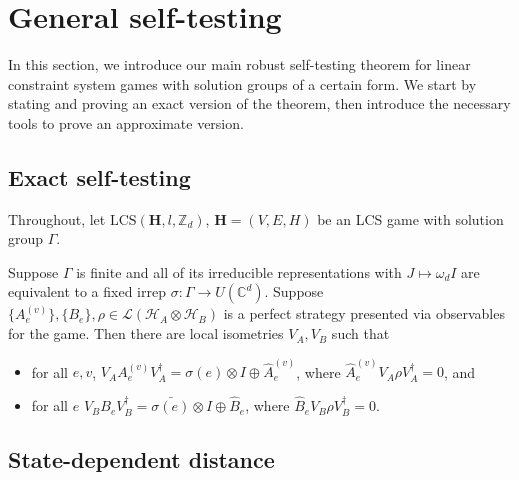 
\chapter{General self-testing}\label{sec:self-testing}

In this section, we introduce our main robust self-testing theorem for linear constraint system games with solution groups of a certain form. We start by stating and proving an exact version of the theorem, then introduce the necessary tools to prove an approximate version.

\section{Exact self-testing}
\label{subsection:exact-self-testing}

Throughout, let $\text{LCS}(\mathbf{H}, l, \mathbb{Z}_d)$, $\mathbf{H} = (V,E,H)$ be an LCS game with solution group $\Gamma$.

\begin{theorem}\label{thm:rigid-self-testing-observables}
Suppose $\Gamma$ is finite and all of its irreducible representations with $J\mapsto \omega_d I$ are equivalent to a fixed irrep $\sigma:\Gamma\to U(\mathbb{C}^d)$. Suppose $\{A_e^{(v)}\}, \{B_e\}, \rho\in \mathcal{L}(\mathcal{H}_A\otimes \mathcal{H}_B)$ is a perfect strategy presented via observables for the game.
Then there are local isometries $V_A, V_B$ such that
	\begin{itemize}
		\item for all $e,v$, $V_AA_e^{(v)}V_A^\dagger = \sigma(e)\otimes I \oplus \hat{A}^{(v)}_e$, where $\hat{A}^{(v)}_e V_A\rho V_A^\dagger = 0$, and
		\item for all $e$ $V_BB_eV_B^\dagger =\bar{\sigma(e)}\otimes I \oplus \hat{B}_e$, where $\hat{B}_e V_B\rho V_B^\dagger = 0$.
	\end{itemize}
\end{theorem}

\section{State-dependent distance}\label{subsection:state-dependent-distance}

